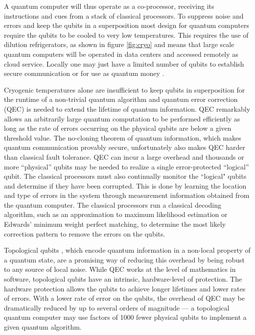 \documentclass[journal]{IEEEtran}
\begin{document}
A quantum computer will thus operate as a co-processor, receiving its instructions and cues from a stack of classical processors. To suppress noise and errors and keep the qubits in a superposition most design for quantum computers require the qubits to be cooled to very low temperatures. This requires the use of dilution refrigerators, as shown in figure \ref{fig:cryo} and means that large scale quantum computers will be operated in data centers and accessed remotely as cloud service. Locally one may just have a limited number of qubits to establish secure communication or for use as quantum money .

Cryogenic temperatures alone are insufficient to keep qubits in superposition for the runtime of a non-trivial quantum algorithm and quantum error correction (QEC) \cite{qec} is needed to extend the lifetime of quantum information.  QEC remarkably allows an arbitrarily large quantum computation to be performed efficiently as long as the rate of errors occurring on the physical qubits are below a given threshold value. The no-cloning theorem of quantum information, which makes quantum communication provably secure, unfortunately also makes QEC harder than classical fault tolerance. QEC can incur a large overhead and thousands or more ``physical'' qubits may be needed to realize a single error-protected ``logical'' qubit. The classical processors must also continually monitor the ``logical" qubits and determine if they have been corrupted.  This is done by learning the location and type of errors in the system through measurement information obtained from the quantum computer.  The classical processors run a classical decoding algorithm, such as an approximation to maximum likelihood estimation or Edwards' minimum weight perfect matching, to determine the most likely correction pattern to remove the errors on the qubits. 

Topological qubits \cite{tqc}, which  encode  quantum information in a non-local property of a quantum state, are a promising way of reducing this overhead by being robust to any source of local noise.  While QEC works at the level of mathematics in software, topological qubits have an intrinsic, hardware-level of protection.  The hardware protection allows the qubits to achieve longer lifetimes and lower rates of errors.  With a lower rate of error on the qubits, the overhead of QEC may be dramatically reduced by up to several orders of magnitude --- a topological quantum computer may use factors of 1000 fewer physical qubits to implement a given quantum algorithm.
\end{document}
